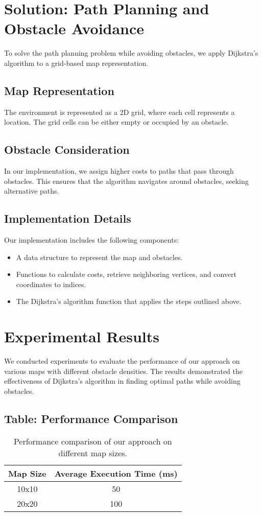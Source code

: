 \documentclass{article}
\begin{document}
\section{Solution: Path Planning and Obstacle Avoidance}
To solve the path planning problem while avoiding obstacles, we apply Dijkstra's algorithm to a grid-based map representation.

\subsection{Map Representation}
The environment is represented as a 2D grid, where each cell represents a location. The grid cells can be either empty or occupied by an obstacle.

\subsection{Obstacle Consideration}
In our implementation, we assign higher costs to paths that pass through obstacles. This ensures that the algorithm navigates around obstacles, seeking alternative paths.

\subsection{Implementation Details}
Our implementation includes the following components:
\begin{itemize}
  \item A data structure to represent the map and obstacles.
  \item Functions to calculate costs, retrieve neighboring vertices, and convert coordinates to indices.
  \item The Dijkstra's algorithm function that applies the steps outlined above.
\end{itemize}

\section{Experimental Results}
We conducted experiments to evaluate the performance of our approach on various maps with different obstacle densities. The results demonstrated the effectiveness of Dijkstra's algorithm in finding optimal paths while avoiding obstacles.

\subsection{Table: Performance Comparison}
\begin{table}[htbp]
  \centering
  \begin{tabular}{|c|c|}
    \hline
    Map Size & Average Execution Time (ms) \\
    \hline
    10x10 & 50 \\
    20x20 & 100 \\
    \hline
  \end{tabular}
  \caption{Performance comparison of our approach on different map sizes.}
  \label{table:performance}
\end{table}
\end{document}
